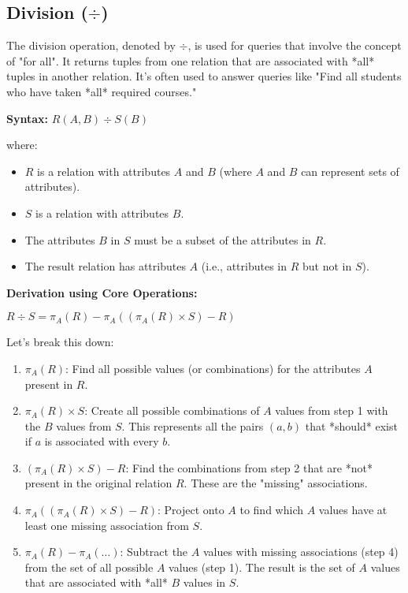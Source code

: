 \documentclass[12pt]{book}
\begin{document}
\subsection{Division ($\div$)}

The division operation, denoted by $\div$, is used for queries that involve the concept of "for all". It returns tuples from one relation that are associated with *all* tuples in another relation. It's often used to answer queries like "Find all students who have taken *all* required courses."

\textbf{Syntax:} $\mathit{R}(A, B) \div \mathit{S}(B)$

where:
\begin{itemize}
    \item $\mathit{R}$ is a relation with attributes $A$ and $B$ (where $A$ and $B$ can represent sets of attributes).
    \item $\mathit{S}$ is a relation with attributes $B$.
    \item The attributes $B$ in $\mathit{S}$ must be a subset of the attributes in $\mathit{R}$.
    \item The result relation has attributes $A$ (i.e., attributes in $\mathit{R}$ but not in $\mathit{S}$).
\end{itemize}

\textbf{Derivation using Core Operations:}

$\mathit{R} \div \mathit{S} = \pi_A(\mathit{R}) - \pi_A((\pi_A(\mathit{R}) \times \mathit{S}) - \mathit{R})$

Let's break this down:
\begin{enumerate}
    \item $\pi_A(\mathit{R})$: Find all possible values (or combinations) for the attributes $A$ present in $\mathit{R}$.
    \item $\pi_A(\mathit{R}) \times \mathit{S}$: Create all possible combinations of $A$ values from step 1 with the $B$ values from $\mathit{S}$. This represents all the pairs $(a, b)$ that *should* exist if $a$ is associated with every $b$.
    \item $(\pi_A(\mathit{R}) \times \mathit{S}) - \mathit{R}$: Find the combinations from step 2 that are *not* present in the original relation $\mathit{R}$. These are the "missing" associations.
    \item $\pi_A((\pi_A(\mathit{R}) \times \mathit{S}) - \mathit{R})$: Project onto $A$ to find which $A$ values have at least one missing association from $\mathit{S}$.
    \item $\pi_A(\mathit{R}) - \pi_A(\dots)$: Subtract the $A$ values with missing associations (step 4) from the set of all possible $A$ values (step 1). The result is the set of $A$ values that are associated with *all* $B$ values in $\mathit{S}$.
\end{enumerate}
\end{document}
